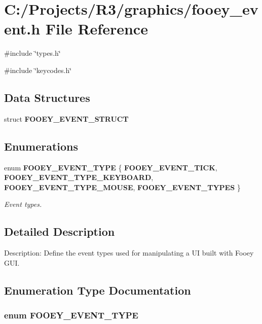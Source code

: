 \section{C:/Projects/R3/graphics/fooey\_\-event.h File Reference}
\label{fooey__event_8h}
{\ttfamily \#include \char`\"{}types.h\char`\"{}}\par
{\ttfamily \#include \char`\"{}keycodes.h\char`\"{}}\par
\subsection*{Data Structures}
\begin{DoxyCompactItemize}
\item 
struct {\bf FOOEY\_\-EVENT\_\-STRUCT}
\end{DoxyCompactItemize}
\subsection*{Enumerations}
\begin{DoxyCompactItemize}
\item 
enum {\bf FOOEY\_\-EVENT\_\-TYPE} \{ {\bf FOOEY\_\-EVENT\_\-TICK}, 
{\bf FOOEY\_\-EVENT\_\-TYPE\_\-KEYBOARD}, 
{\bf FOOEY\_\-EVENT\_\-TYPE\_\-MOUSE}, 
{\bf FOOEY\_\-EVENT\_\-TYPES}
 \}
\begin{DoxyCompactList}\small\item\em Event types. \item\end{DoxyCompactList}\end{DoxyCompactItemize}


\subsection{Detailed Description}
Description: Define the event types used for manipulating a UI built with Fooey GUI. 

\subsection{Enumeration Type Documentation}
\subsubsection[{FOOEY\_\-EVENT\_\-TYPE}]{\setlength{\rightskip}{0pt plus 5cm}enum {\bf FOOEY\_\-EVENT\_\-TYPE}}\label{fooey__event_8h_a31120d8a4020cc4a50d17e5a0c20b095}


